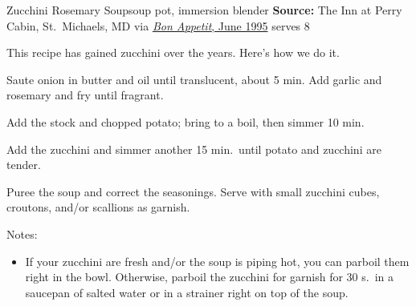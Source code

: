 \begin{recipe}[]{Zucchini Rosemary Soup}{soup pot, immersion blender \hfill }%
 {\textbf{Source:} The Inn at Perry Cabin, St.\ Michaels, MD via \href{https://www.epicurious.com/recipes/food/views/zucchini-and-rosemary-soup-252}{\textit{Bon Appetit}, June 1995} \hfill serves 8}

 \freeform This recipe has gained zucchini over the years. Here's how we do it.

 Saute onion in butter and oil until translucent, about 5 min. Add garlic and rosemary and fry until fragrant.

 Add the stock and chopped potato; bring to a boil, then simmer 10 min.

 Add the zucchini and simmer another 15 min.\ until potato and zucchini are tender.

 Puree the soup and correct the seasonings. Serve with small zucchini cubes, croutons, and/or scallions as garnish.

 \freeform Notes:
 \begin{itemize}
  \item If your zucchini are fresh and/or the soup is piping hot, you can parboil them right in the bowl. Otherwise, parboil the zucchini for garnish for 30 s.\ in a saucepan of salted water or in a strainer right on top of the soup.
 \end{itemize}
\end{recipe}
